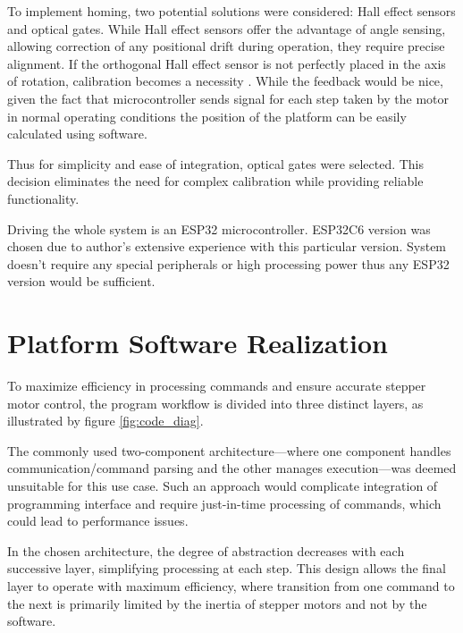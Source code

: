 To implement homing, two potential solutions were considered: Hall effect sensors and optical gates.
While Hall effect sensors offer the advantage of angle sensing, allowing correction of any positional drift during operation, they require precise alignment.
If the orthogonal Hall effect sensor is not perfectly placed in the axis of rotation, calibration becomes a necessity \cite{hall}.
While the feedback would be nice, given the fact that microcontroller sends signal for each step taken by the motor in normal operating conditions the position of the platform can be easily calculated using software.

Thus for simplicity and ease of integration, optical gates were selected.
This decision eliminates the need for complex calibration while providing reliable functionality.

Driving the whole system is an ESP32 microcontroller.
ESP32C6 version was chosen due to author's extensive experience with this particular version.
System doesn't require any special peripherals or high processing power thus any ESP32 version would be sufficient.

\section{Platform Software Realization}

To maximize efficiency in processing commands and ensure accurate stepper motor control, the program workflow is divided into three distinct layers, as illustrated by figure \ref{fig:code_diag}.

The commonly used two-component architecture—where one component handles communication/command parsing and the other manages execution—was deemed unsuitable for this use case.
Such an approach would complicate integration of programming interface and require just-in-time processing of commands, which could lead to performance issues.

In the chosen architecture, the degree of abstraction decreases with each successive layer, simplifying processing at each step.
This design allows the final layer to operate with maximum efficiency, where transition from one command to the next is primarily limited by the inertia of stepper motors and not by the software.

